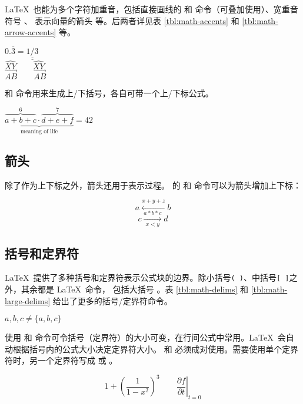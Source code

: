 \LaTeX\ 也能为多个字符加重音，包括直接画线的  和  命令（可叠加使用）、宽重音符号 、
表示向量的箭头  等。后两者详见表 \ref{tbl:math-accents} 和 \ref{tbl:math-arrow-accents} 等。
\begin{example}
$0.\overline{3} =
\underline{\underline{1/3}}$ \\[5pt]
$\hat{XY} \qquad \widehat{XY}$\\[5pt]
$\vec{AB} \qquad
\overrightarrow{AB}$
\end{example}

 和  命令用来生成上/下括号，各自可带一个上/下标公式。
\begin{example}
$\underbrace{\overbrace{a+b+c}^6
\cdot \overbrace{d+e+f}^7}
_\text{meaning of life} = 42$
\end{example}

\subsection{箭头}

除了作为上下标之外，箭头还用于表示过程。 的  和  命令可以为箭头增加上下标：
\begin{example}
\[ a\xleftarrow{x+y+z} b \]
\[ c\xrightarrow[x<y]{a*b*c}d \]
\end{example}

\subsection{括号和定界符}

\LaTeX\ 提供了多种括号和定界符表示公式块的边界。除小括号\texttt{( )}、中括号\texttt{[ ]}之外，其余都是 \LaTeX\ 命令，
包括大括号 \cmd{\{} \cmd{\}}。表 \ref{tbl:math-delims} 和 \ref{tbl:math-large-delims} 给出了更多的括号/定界符命令。
\begin{example}
${a,b,c} \neq \{a,b,c\}$
\end{example}

使用  和  命令可令括号（定界符）的大小可变，在行间公式中常用。\LaTeX\ 会自动根据括号内的公式大小决定定界符大小。
 和  必须成对使用。需要使用单个定界符时，另一个定界符写成  或 。
\begin{example}
\[1 + \left(\frac{1}{1-x^{2}}
\right)^3 \qquad
\left.\frac{\partial f}{\partial t}
\right|_{t=0}\]
\end{example}

